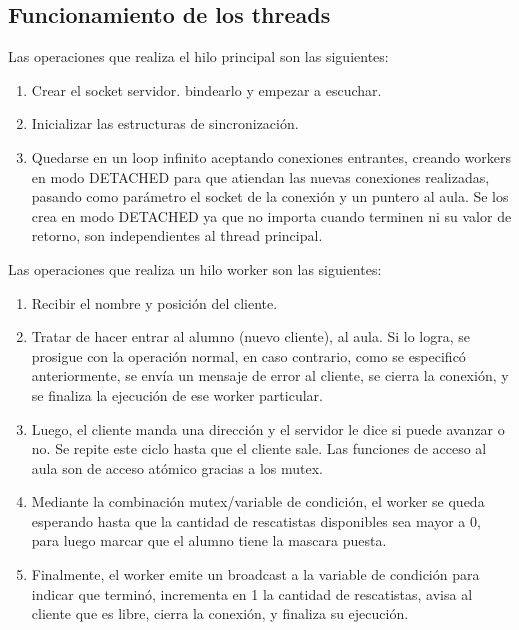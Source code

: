 \subsection{Funcionamiento de los threads}

Las operaciones que realiza el hilo principal son las siguientes:

\begin{enumerate}
\item Crear el socket servidor. bindearlo y empezar a escuchar.
\item Inicializar las estructuras de sincronizaci\'on.
\item Quedarse en un loop infinito aceptando conexiones entrantes, creando workers en modo DETACHED para que atiendan las nuevas conexiones realizadas, pasando como par\'ametro el socket de la conexi\'on y un puntero al aula. Se los crea en modo DETACHED ya que no importa cuando terminen ni su valor de retorno, son independientes al thread principal.
\end{enumerate}

Las operaciones que realiza un hilo worker son las siguientes:

\begin{enumerate}
\item Recibir el nombre y posici\'on del cliente.
\item Tratar de hacer entrar al alumno (nuevo cliente), al aula. Si lo logra, se prosigue con la operaci\'on normal, en caso contrario, como se especific\'o anteriormente, se env\'ia un mensaje de error al cliente, se cierra la conexi\'on, y se finaliza la ejecuci\'on de ese worker particular.
\item Luego, el cliente manda una direcci\'on y el servidor le dice si puede avanzar o no. Se repite este ciclo hasta que el cliente sale. Las funciones de acceso al aula son de acceso at\'omico gracias a los mutex.
\item Mediante la combinaci\'on mutex/variable de condici\'on, el worker se queda esperando hasta que la cantidad de rescatistas disponibles sea mayor a 0, para luego marcar que el alumno tiene la mascara puesta.
\item Finalmente, el worker emite un broadcast a la variable de condici\'on para indicar que termin\'o, incrementa en 1 la cantidad de rescatistas, avisa al cliente que es libre, cierra la conexi\'on, y finaliza su ejecuci\'on.
\end{enumerate}

